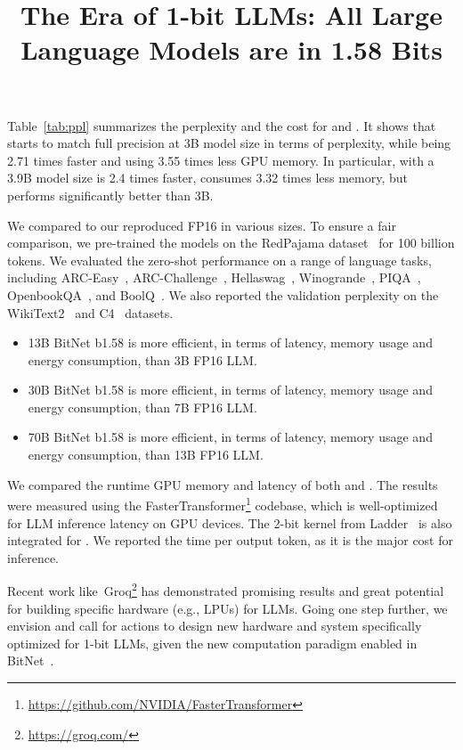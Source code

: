 \title{The Era of 1-bit LLMs: All Large Language Models are in 1.58 Bits}
Table~\ref{tab:ppl} summarizes the perplexity and the cost for  and . It shows that  starts to match full precision  at 3B model size in terms of perplexity, while being 2.71 times faster and using 3.55 times less GPU memory. In particular,  with a 3.9B model size is 2.4 times faster, consumes 3.32 times less memory, but performs significantly better than  3B. 

We compared  to our reproduced FP16  in various sizes. To ensure a fair comparison, we pre-trained the models on the RedPajama dataset~\cite{redpajama} for 100 billion tokens. We evaluated the zero-shot performance on a range of language tasks, including ARC-Easy~\cite{arc}, ARC-Challenge~\cite{arc}, Hellaswag~\cite{hellaswag}, Winogrande~\cite{winoGrande}, PIQA~\cite{piqa}, OpenbookQA~\cite{openbookqa}, and BoolQ~\cite{boolq}. We also reported the validation perplexity on the WikiText2~\cite{wikitext2} and C4~\cite{c4} datasets.

\begin{itemize}
    \item 13B BitNet b1.58 is more efficient, in terms of latency, memory usage and energy consumption, than 3B FP16 LLM.
    \item 30B BitNet b1.58 is more efficient, in terms of latency, memory usage and energy consumption, than 7B FP16 LLM.
    \item 70B BitNet b1.58 is more efficient, in terms of latency, memory usage and energy consumption, than 13B FP16 LLM.
\end{itemize}

We compared the runtime GPU memory and latency of both  and . The results were measured using the FasterTransformer\footnote{\url{https://github.com/NVIDIA/FasterTransformer}} codebase, which is well-optimized for LLM inference latency on GPU devices. The 2-bit kernel from Ladder~\cite{ladder} is also integrated for . We reported the time per output token, as it is the major cost for inference.

Recent work like~Groq\footnote{\url{https://groq.com/}} has demonstrated promising results and great potential for building specific hardware (e.g., LPUs) for LLMs. Going one step further, we envision and call for actions to design new hardware and system specifically optimized for 1-bit LLMs, given the new computation paradigm enabled in BitNet~\cite{bitnet}.

